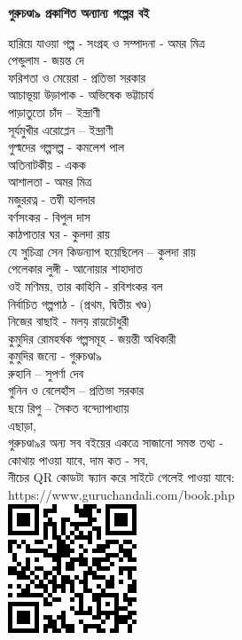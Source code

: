 \clearpage
\small
\centering
\textbf{গুরুচণ্ডা৯ প্রকাশিত অন্যান্য গল্পের বই} \\
\raggedright
\scriptsize
হারিয়ে যাওয়া গল্প - সংগ্রহ ও সম্পাদনা - অমর মিত্র \\
পেন্ডুলাম - জয়ন্ত দে \\
ফরিশতা ও মেয়েরা - প্রতিভা সরকার \\
আচাভূয়া উড়াপাক - অভিষেক ভট্টাচার্য \\
পাড়াতুতো চাঁদ – ইন্দ্রাণী \\
সূর্যমুখীর এরোপ্লেন – ইন্দ্রাণী \\
গুল্মদের গল্পসল্প - কমলেশ পাল \\
অতিনাটকীয় - একক \\
আশালতা - অমর মিত্র \\
মজুররত্ন - তন্বী হালদার \\
বর্ণসংকর - বিপুল দাস \\
কাঠপাতার ঘর - কুলদা রায় \\
যে সুচিত্রা সেন কিডন্যাপ হয়েছিলেন – কুলদা রায় \\
পেলেকার লুঙ্গী - আনোয়ার শাহাদাত \\
ওই মণিময়, তার কাহিনি - রবিশংকর বল \\ 
নির্বাচিত গল্পপাঠ - (প্রথম, দ্বিতীয় খণ্ড) \\
নিজের বাছাই - মলয় রায়চৌধুরী \\
কুমুদির রোমহর্ষক গল্পসমূহ - জয়ন্তী অধিকারী \\
কুমুদির জন্যে - গুরুচণ্ডা৯ \\
রুহানি – সুপর্ণা দেব \\
গুনিন ও বেলেহাঁস – প্রতিভা সরকার \\
ছয়ে রিপু – সৈকত বন্দ্যোপাধ্যায় \\
\baselineskip
\raggedleft
\scriptsize
এছাড়া, \\
গুরুচণ্ডা৯র অন্য সব বইয়ের একত্রে সাজানো সমস্ত তথ্য - \\
কোথায় পাওয়া যাবে, দাম কত - সব, \\
নীচের QR কোডটা স্ক্যান করে সাইটে গেলেই পাওয়া যাবে: \\
https://www.guruchandali.com/book.php \\
\baselineskip
\includegraphics[scale=0.8]{Images/QRCode_2022.png}